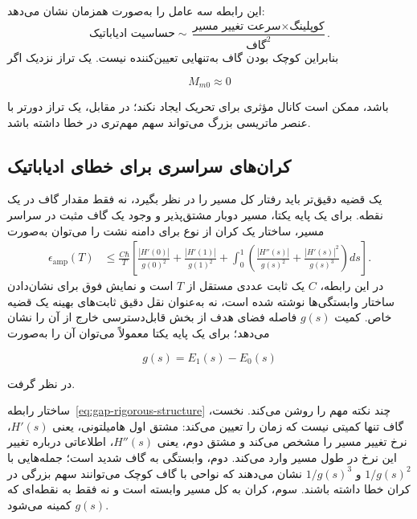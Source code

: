 این رابطه سه عامل را به‌صورت همزمان نشان می‌دهد:
\begin{equation}
	\boxed{
		\text{حساسیت ادیاباتیک}
		\sim
		\frac{
			\text{سرعت تغییر مسیر}\times
			\text{کوپلینگ}
		}{
			\text{گاف}^2
		}
	}.
\end{equation}
بنابراین کوچک بودن گاف به‌تنهایی تعیین‌کننده نیست. یک تراز نزدیک
اگر

$$
M_{m0}\approx0
$$

باشد، ممکن است کانال مؤثری برای تحریک ایجاد نکند؛ در مقابل، یک تراز
دورتر با عنصر ماتریسی بزرگ می‌تواند سهم مهم‌تری در خطا داشته باشد.

\subsection{کران‌های سراسری برای خطای ادیاباتیک}

یک قضیه دقیق‌تر باید رفتار کل مسیر را در نظر بگیرد، نه فقط مقدار
گاف در یک نقطه. برای یک پایه یکتا، مسیر دوبار مشتق‌پذیر و وجود یک
گاف مثبت در سراسر مسیر، ساختار یک کران از نوع
 برای دامنه نشت را می‌توان به‌صورت
\begin{align}
	\epsilon_{\mathrm{amp}}(T)
	&\leq
	\frac{C\hbar}{T}
	\left[
	\frac{|H'(0)|}{g(0)^2}
	+
	\frac{|H'(1)|}{g(1)^2}
	+\int_0^1
	\left(
	\frac{|H''(s)|}{g(s)^2}
	+
	\frac{|H'(s)|^2}{g(s)^3}
	\right)ds
	\right].
	\label{eq:gap-rigorous-structure}
\end{align}
در این رابطه، $C$ یک ثابت عددی مستقل از $T$ است و نمایش فوق برای
نشان‌دادن ساختار وابستگی‌ها نوشته شده است، نه به‌عنوان نقل دقیق
ثابت‌های بهینه یک قضیه خاص. کمیت $g(s)$ فاصله فضای هدف از بخش
قابل‌دسترسی خارج از آن را نشان می‌دهد؛ برای یک پایه یکتا معمولاً
می‌توان آن را به‌صورت

$$
g(s)=E_1(s)-E_0(s)
$$

در نظر گرفت.

ساختار رابطه~\eqref{eq:gap-rigorous-structure} چند نکته مهم را
روشن می‌کند. نخست، گاف تنها کمیتی نیست که زمان را تعیین می‌کند:
مشتق اول هامیلتونی، یعنی $H'(s)$، نرخ تغییر مسیر را مشخص می‌کند و
مشتق دوم، یعنی $H''(s)$، اطلاعاتی درباره تغییر این نرخ در طول مسیر
وارد می‌کند. دوم، وابستگی به گاف شدید است؛ جمله‌هایی با
$1/g(s)^2$ و $1/g(s)^3$ نشان می‌دهند که نواحی با گاف کوچک می‌توانند
سهم بزرگی در کران خطا داشته باشند. سوم، کران به کل مسیر وابسته است
و نه فقط به نقطه‌ای که $g(s)$ کمینه می‌شود.

